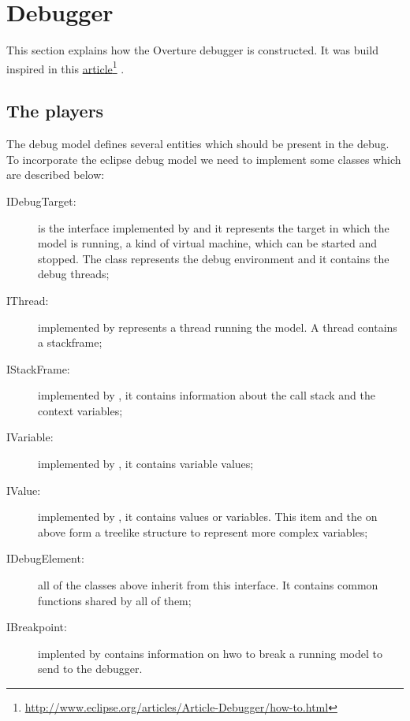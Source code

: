 \section{Debugger}

This section explains how the Overture debugger is constructed. It was build inspired in this \href{http://www.eclipse.org/articles/Article-Debugger/how-to.html}{article}\footnote{\url{http://www.eclipse.org/articles/Article-Debugger/how-to.html}} \cite{Wright&04}. 


\subsection{The players}
The debug model defines several entities which should be present in the debug. To incorporate the eclipse debug model we need to implement some classes which are described below:
\begin{description}
\item[IDebugTarget:] is the interface implemented by  and it represents the target in which the model is running, a kind of virtual machine, which can be started and stopped. The class represents the debug environment and it contains the debug threads;

\item[IThread:] implemented by  represents a thread running the model. A thread contains a stackframe;

\item[IStackFrame:] implemented by , it contains information about the call stack and the context variables;

\item[IVariable:] implemented by , it contains variable values;

\item[IValue:]  implemented by , it contains values or variables. This item and the on above form a treelike structure to represent more complex variables;

\item[IDebugElement:] all of the classes above inherit from this interface. It contains common functions shared by all of them;

\item[IBreakpoint:] implented by  contains information on hwo to break a running model to send to the debugger.
\end{description} 

